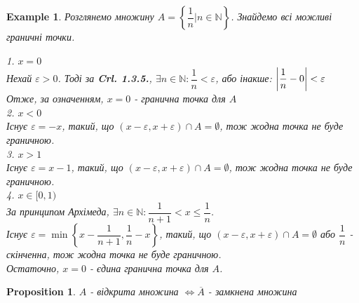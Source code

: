 \documentclass[a4paper, 14pt]{article}
\theoremstyle{theoremdd}
\theoremstyle{theoremdd}
\theoremstyle{theoremdd}
\theoremstyle{theoremdd}
\newtheorem{example}[theorem]{Example}
\theoremstyle{theoremdd}
\newtheorem{proposition}[theorem]{Proposition}
\theoremstyle{theoremdd}
\theoremstyle{theoremdd}
\theoremstyle{theoremdd}
\begin{document}
\begin{example}
Розглянемо множину $A = \left\{ \dfrac{1}{n} | n \in \mathbb{N} \right\}$. Знайдемо всі можливі граничні точки.
\begin{figure}[H]
\centering
{}
\end{figure}
1. $x = 0$\\
Нехай $\varepsilon > 0$. Тоді за \textbf{Crl. 1.3.5.}, $\exists n \in \mathbb{N}: \dfrac{1}{n} < \varepsilon$, або інакше: $\abs{\dfrac{1}{n}-0} < \varepsilon$\\
Отже, за означенням, $x = 0$ - гранична точка для $A$
\bigskip \\
2. $x < 0$\\
Існує $\varepsilon = -x$, такий, що $(x-\varepsilon,x+\varepsilon) \cap A = \emptyset$, тож жодна точка не буде граничною.
\bigskip \\
3. $x > 1$\\
Існує $\varepsilon = x-1$, такий, що $(x-\varepsilon,x+\varepsilon) \cap A = \emptyset$, тож жодна точка не буде граничною.
\bigskip \\
4. $x \in [0,1)$\\
За принципом Архімеда, $\exists n \in \mathbb{N}: \dfrac{1}{n+1} < x \leq \dfrac{1}{n}$.\\
Існує $\varepsilon = \min \left\{ x - \dfrac{1}{n+1}, \dfrac{1}{n} - x \right\}$, такий, що $(x-\varepsilon, x+\varepsilon) \cap A = \emptyset$ або $\dfrac{1}{n}$ - скінченна, тож жодна точка не буде граничною.
\bigskip \\
Остаточно, $x = 0$ - єдина гранична точка для $A$.

\end{example}

\begin{proposition}
$A$ - відкрита множина $\iff \overline{A}$ - замкнена множина
\end{proposition}
\end{document}
